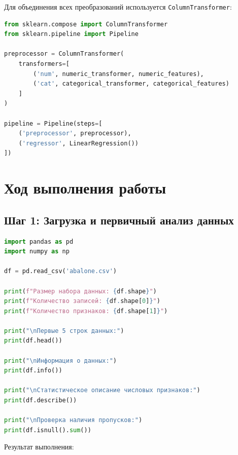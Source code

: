Для объединения всех преобразований используется \texttt{ColumnTransformer}:

\begin{lstlisting}[language=Python, caption=Построение пайплайна]
from sklearn.compose import ColumnTransformer
from sklearn.pipeline import Pipeline

preprocessor = ColumnTransformer(
    transformers=[
        ('num', numeric_transformer, numeric_features),
        ('cat', categorical_transformer, categorical_features)
    ]
)

pipeline = Pipeline(steps=[
    ('preprocessor', preprocessor),
    ('regressor', LinearRegression())
])
\end{lstlisting}

\section{Ход выполнения работы}

\subsection{Шаг 1: Загрузка и первичный анализ данных}

\begin{lstlisting}[language=Python, caption=Загрузка и анализ данных]
import pandas as pd
import numpy as np

df = pd.read_csv('abalone.csv')

print(f"Размер набора данных: {df.shape}")
print(f"Количество записей: {df.shape[0]}")
print(f"Количество признаков: {df.shape[1]}")

print("\nПервые 5 строк данных:")
print(df.head())

print("\nИнформация о данных:")
print(df.info())

print("\nСтатистическое описание числовых признаков:")
print(df.describe())

print("\nПроверка наличия пропусков:")
print(df.isnull().sum())
\end{lstlisting}

Результат выполнения:

